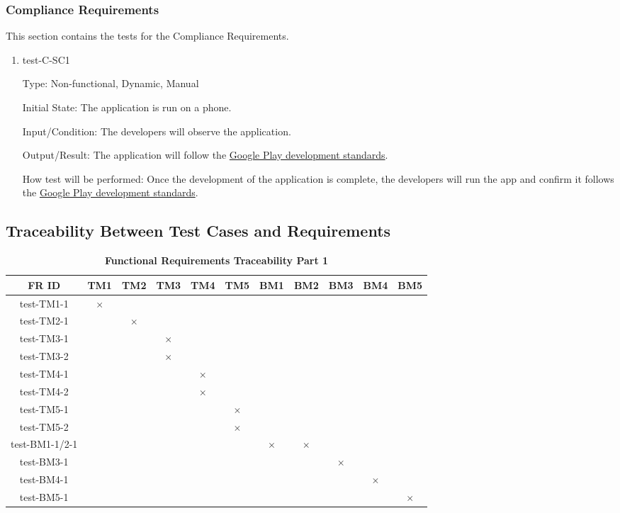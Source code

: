 \documentclass[12pt, titlepage]{article}
\begin{document}
\subsubsection{Compliance Requirements}

This section contains the tests for the Compliance Requirements.
		
\begin{enumerate}

\item{test-C-SC1\\}

Type: Non-functional, Dynamic, Manual 
					
Initial State: The application is run on a phone.
					
Input/Condition: The developers will observe the application.
					
Output/Result: The application will follow the \href{https://play.google.com/about/developer-content-policy/}{Google Play development standards}.
					
How test will be performed: Once the development of the application is complete, the developers will run the app and confirm it follows the \href{https://play.google.com/about/developer-content-policy/}{Google Play development standards}.

\end{enumerate}

\subsection{Traceability Between Test Cases and Requirements}


\begin{table}[H]
\centering
\begin{tabular}{|c|c|c|c|c|c|c|c|c|c|c|}
\hline
FR ID & TM1 & TM2 & TM3 & TM4 & TM5 & BM1 & BM2 & BM3 & BM4 & BM5 \\
\hline 
test-TM1-1 & $\times$ & & & & & & & & & \\
test-TM2-1 & & $\times$ & & & & & & & & \\
test-TM3-1 & & & $\times$ & & & & & & & \\
test-TM3-2 & & &  $\times$& & & & & & & \\
test-TM4-1 & & & & $\times$ & & & & & & \\
test-TM4-2 & & & & $\times$ & & & & & & \\
test-TM5-1 & & & & & $\times$ & & & & & \\
test-TM5-2 & & & & & $\times$ & & & & & \\
test-BM1-1/2-1 & & & & & & $\times$ & $\times$ & & & \\
test-BM3-1 & & & & & & & & $\times$ & & \\
test-BM4-1 & & & & & & & & & $\times$ & \\
test-BM5-1 & & & & & & & & & & $\times$ \\

\hline
\end{tabular}
\caption{\bf Functional Requirements Traceability Part 1}
\end{table}
\end{document}
